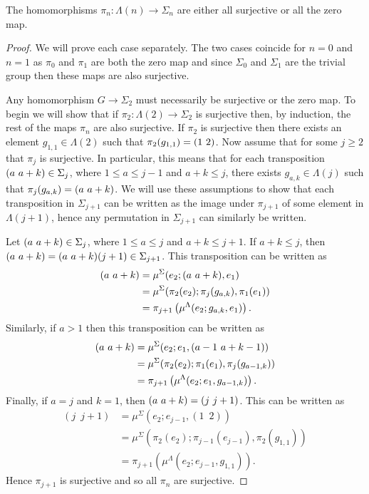\begin{prop}\label{surjortriv}
The homomorphisms $\pi_n \colon \Lambda(n) \rightarrow \Sigma_n$ are either all surjective or all the zero map.
\end{prop}
\begin{proof}
We will prove each case separately. The two cases coincide for $n = 0$ and $n = 1$ as $\pi_0$ and $\pi_1$ are both the zero map and since $\Sigma_0$ and $\Sigma_1$ are the trivial group then these maps are also surjective.

Any homomorphism $G \rightarrow \Sigma_2$ must necessarily be surjective or the zero map. To begin we will show that if $\pi_2 \colon \Lambda(2) \rightarrow \Sigma_2$ is surjective then, by induction, the rest of the maps $\pi_n$ are also surjective. If $\pi_2$ is surjective then there exists an element $g_{1,1} \in \Lambda(2)$ such that $\pi_2(g_{1,1}) = ( 1 \, \, 2 )$. Now assume that for some $j \geq 2$ that $\pi_j$ is surjective. In particular, this means that for each transposition $( a \, \, a+k ) \in \Sigma_j$, where $1 \leq a \leq j-1$ and $a + k \leq j$, there exists $g_{a,k} \in \Lambda(j)$ such that $\pi_j(g_{a,k}) = ( a \, \, a+k )$. We will use these assumptions to show that each transposition in $\Sigma_{j+1}$ can be written as the image under $\pi_{j+1}$ of some element in $\Lambda(j+1)$, hence any permutation in $\Sigma_{j+1}$ can similarly be written.


Let $( a \, \, a+k ) \in \Sigma_j$, where $1 \leq a \leq j$ and $a + k \leq j+1$. If $a + k \leq j$, then $( a \, \, a+k ) = ( a \, \, a+k )(j + 1) \in \Sigma_{j+1}$. This transposition can be written as
  \begin{align*}
    ( a \, \, a+k ) &= \mu^{\Sigma}(e_2 ; ( a \, \, a+k ), e_1) \\
              &= \mu^{\Sigma}(\pi_2(e_2); \pi_j(g_{a,k}), \pi_1(e_1)) \\
              &= \pi_{j+1}\left(\mu^{\Lambda}(e_2; g_{a,k},e_1)\right).
  \end{align*}
Similarly, if $a > 1$ then this transposition can be written as
  \begin{align*}
   ( a \, \, a+k ) &= \mu^{\Sigma}(e_2 ; e_1, ( a-1 \, \, a+k-1 )) \\
              &= \mu^{\Sigma}(\pi_2(e_2); \pi_1(e_1), \pi_j(g_{a-1,k})) \\
              &= \pi_{j+1}\left(\mu^{\Lambda}(e_2; e_1, g_{a-1,k})\right).
  \end{align*}
Finally, if $a = j$ and $k = 1$, then $( a \, \, a+k ) = ( j \, \, j+1 )$. This can be written as
  \begin{align*}
    (j \,\,\, j + 1) &= \mu^{\Sigma}(e_2 ; e_{j-1}, (1 \,\,\, 2)) \\
              &= \mu^{\Sigma}(\pi_2(e_2); \pi_{j-1}(e_{j-1}), \pi_2(g_{1,1})) \\
              &= \pi_{j+1}\left(\mu^{\Lambda}(e_2; e_{j-1}, g_{1,1})\right).
  \end{align*}
Hence $\pi_{j+1}$ is surjective and so all $\pi_n$ are surjective.


\end{proof}
